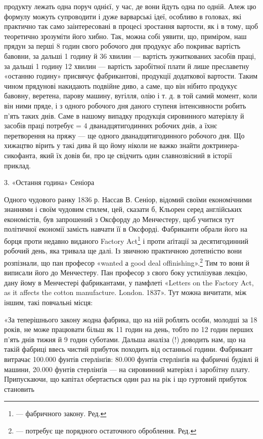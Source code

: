 продукту лежать одна поруч однієї, у час, де вони йдуть одна по одній. Алеж цю формулу можуть
супроводити і дуже варварські ідеї, особливо в головах, які практично так само заінтересовані
в процесі зростання вартости, як і в тому, щоб теоретично зрозуміти його хибно. Так, можна собі
уявити, що, приміром, наш прядун за перші 8 годин свого робочого дня продукує або покриває вартість
бавовни, за дальші 1 годину й 36 хвилин — вартість зужиткованих засобів праці, за дальші 1 годину 12
хвилин — вартість заробітної плати й лише преславетну «останню
годину» присвячує фабрикантові, продукції додаткової вартости. Таким чином прядунові накидають
подвійне диво, а саме, що він нібито продукує бавовну, веретена, парову машину, вугілля,
олію і т. д. в той самий момент, коли він ними пряде, і з одного робочого дня даного ступеня
інтенсивности робить п’ять
таких днів. Саме в нашому випадку продукція сировинного матеріялу й засобів праці потребує  = 4
дванадцятигодинних робочих днів, а їхнє перетворення на пряжу — ще одного дванадцятигодинного
робочого дня. Що хижацтво вірить у такі дива й що йому ніколи не важко знайти доктринера-сикофанта,
який їх довів би, про це свідчить один славнозвісний в історії приклад.

3. «Остання година» Сеніора

Одного чудового ранку 1836 р. Нассав В. Сеніор, відомий своїми економічними знаннями і своїм чудовим
стилем, цей, сказати б, Кльорен серед англійських економістів, був запрошений
з Оксфорду до Менчестеру, щоб учитися тут політичної економії замість навчати її в Оксфорді.
Фабриканти обрали його на борця проти недавно виданого Factory Act\footnote*{
— фабричного закону. Ред.
} і проти аґітації за
десятигодинний
робочий день, яка тривала ще далі. Із звичною практичною дотепністю вони розпізнали, що пан професор
«wanted а
good deal offinishing».\footnote*{
— потребує ще порядного остаточного оброблення. Ред.
} Тим то вони й виписали його до Менчестеру. Пан професор з свого боку
устилізував лекцію, дану йому в Менчестері фабрикантами, у памфлеті «Letters on the Factory Act, as
it affects the cotton manufacture. London. 1837». Тут можна вичитати, між іншим, такі повчальні
місця:

«За теперішнього закону жодна фабрика, що на ній роблять особи, молодші за 18 років, не може
працювати більш як 11 годин на день, тобто по 12 годин перших п’ять днів тижня й 9 годин
суботами. Дальша аналіза (!) доводить нам, що на такій фабриці ввесь чистий прибуток походить від
останньої години. Фабрикант
витрачає 100.000 фунтів стерлінґів: 80.000 фунтів стерлінґів на фабричні будівлі й машини, 20.000
фунтів стерлінґів — на сировинний матеріял і заробітну плату. Припускаючи, що капітал обертається
один раз на рік і що гуртовий прибуток становить